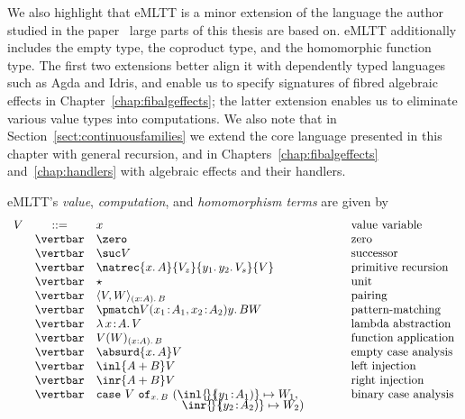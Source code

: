 We also highlight that eMLTT is a minor extension of the language the author studied in the paper~\cite{Ahman:FibredEffects} large parts of this thesis are based on. eMLTT additionally includes the empty type, the coproduct type, and the homomorphic function type. The first two extensions better align it with dependently typed  languages such as Agda and Idris, and enable us to specify signatures of fibred algebraic effects in Chapter~\ref{chap:fibalgeffects}; the latter extension enables us to eliminate various value types into computations.
We also note that in Section~\ref{sect:continuousfamilies} we extend the core language presented in this chapter with general recursion, and in Chapters~\ref{chap:fibalgeffects} and~\ref{chap:handlers} with  algebraic effects and their handlers.

\begin{definition}
\label{def:terms}
eMLTT's \emph{value}, \emph{computation}, and \emph{homomorphism terms} are given by
\[
\begin{array}{r c l @{\qquad\qquad}l}
V & ::= & x & \text{value variable}
\\
& \vertbar & \zero & \text{zero}
\\
& \vertbar & \suc V & \text{successor}
\\
& \vertbar & \natrec {x.\,A} {V_z} {y_1.\, y_2.\, V_s} {V} & \text{primitive recursion}
\\
& \vertbar & \star & \text{unit}
\\
& \vertbar & \langle V , W \rangle_{(x : A).\, B}  & \text{pairing}
\\
& \vertbar & \pmatch V {(x_1 \!:\! A_1, x_2 \!:\! A_2)} {y.\, B} W & \text{pattern-matching}
\\
& \vertbar & \lambda \, x \!:\! A .\, V & \text{lambda abstraction}
\\
& \vertbar & V(W)_{(x : A).\,B}  & \text{function application}
\\
& \vertbar & \absurd {x.\,A} V & \text{empty case analysis}
\\
& \vertbar & \inl {A + B} V & \text{left injection}
\\
& \vertbar & \inr {A + B} V & \text{right injection}
\\
& \vertbar & \mathtt{case~} V \mathtt{~of}_{x.\,B} \mathtt{~} ({\inl {\!} {\!\!(y_1 \!:\! A_1)} \mapsto W_1}, & \text{binary case analysis}
\\[-1mm]
&& \hspace{2.55cm} {\inr {\!} {\!\!(y_2 \!:\! A_2)} \mapsto W_2})
\\

\end{array}\]
\end{definition}
